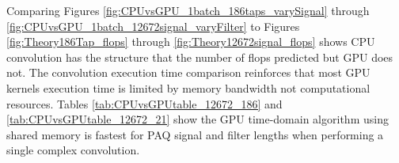 Comparing Figures \ref{fig:CPUvsGPU_1batch_186taps_varySignal} through \ref{fig:CPUvsGPU_1batch_12672signal_varyFilter}
to Figures \ref{fig:Theory186Tap_flops} through
\ref{fig:Theory12672signal_flops} 
shows
CPU convolution has the structure that the number of flops predicted but GPU does not.
The convolution execution time comparison reinforces that most GPU kernels execution time is limited by memory bandwidth not computational resources.
Tables \ref{tab:CPUvsGPUtable_12672_186} and \ref{tab:CPUvsGPUtable_12672_21} show the GPU time-domain algorithm using shared memory is fastest for PAQ signal and filter lengths when performing a single complex convolution.
%
%
%
%
%
%
